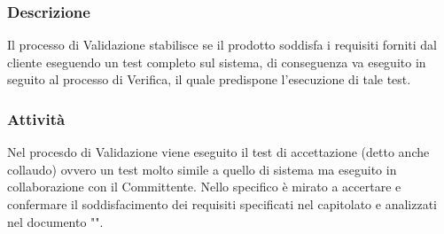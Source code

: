     \subsubsection{Descrizione}
      Il processo di Validazione stabilisce se il prodotto soddisfa i requisiti forniti dal cliente eseguendo un test completo sul sistema, di conseguenza va eseguito in seguito al processo di Verifica, il quale predispone l'esecuzione di tale test.

    \subsubsection{Attività}
        Nel procesdo di Validazione viene eseguito il test di accettazione (detto anche collaudo) ovvero un test molto simile a quello di sistema ma eseguito in collaborazione con il Committente. Nello specifico è mirato a accertare e confermare il soddisfacimento dei requisiti specificati nel capitolato e analizzati nel documento "\AdR".

